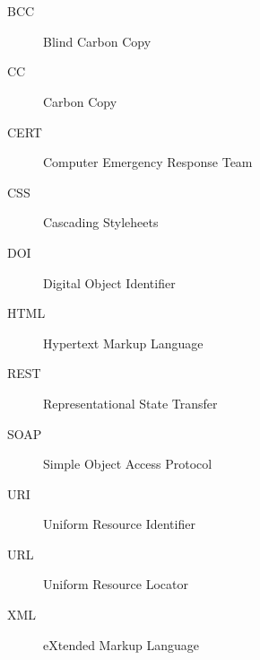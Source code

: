 \chapter*{\SeznamZkratek}

\begin{multicols}{2}
\raggedright
\begin{description}
\item [BCC] Blind Carbon Copy
\item [CC] Carbon Copy
\item [CERT] Computer Emergency Response Team
\item [CSS] Cascading Styleheets
\item [DOI] Digital Object Identifier
\item [HTML] Hypertext Markup Language
\item [REST] Representational State Transfer
\item [SOAP] Simple Object Access Protocol
\item [URI] Uniform Resource Identifier
\item [URL] Uniform Resource Locator
\item [XML] eXtended Markup Language
\end{description}
\end{multicols}
